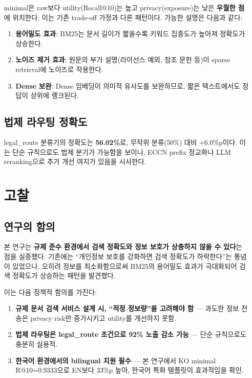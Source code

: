 \documentclass[11pt,a4paper]{article}
\begin{document}
minimal은 raw보다 utility(Recall@10)는 높고 privacy(exposure)는 낮은 \textbf{우월한 점}에 위치한다. 이는 기존 trade-off 가정과 다른 패턴이다. 가능한 설명은 다음과 같다:

\begin{enumerate}
\item \textbf{용어밀도 효과}: BM25는 문서 길이가 짧을수록 키워드 집중도가 높아져 정확도가 상승한다.
\item \textbf{노이즈 제거 효과}: 원문의 부가 설명(라이선스 예외, 참조 문헌 등)이 sparse retrieval에 노이즈로 작용한다.
\item \textbf{Dense 보완}: Dense 임베딩이 의미적 유사도를 보완하므로, 짧은 텍스트에서도 정답이 상위에 랭크된다.
\end{enumerate}

\subsection{법제 라우팅 정확도}
legal\_route 분류기의 정확도는 \textbf{56.02\%}로, 무작위 분류(50\%) 대비 +6.0\%p이다. 이는 단순 규칙으로도 법제 분기가 가능함을 보이나, ECCN prefix 정교화나 LLM reranking으로 추가 개선 여지가 있음을 시사한다.

\section{고찰}
\label{sec:discussion}

\subsection{연구의 함의}
본 연구는 \textbf{규제 준수 환경에서 검색 정확도와 정보 보호가 상충하지 않을 수 있다}는 점을 실증했다. 기존에는 ``개인정보 보호를 강화하면 검색 정확도가 하락한다''는 통념이 있었으나, 오히려 정보를 최소화함으로써 BM25의 용어밀도 효과가 극대화되어 검색 정확도가 상승하는 패턴을 발견했다.

이는 다음 정책적 함의를 가진다:

\begin{enumerate}
\item \textbf{규제 문서 검색 서비스 설계 시, ``적정 정보량''을 고려해야 함} — 과도한 정보 전송은 privacy risk만 증가시키고 utility를 개선하지 못함.
\item \textbf{법제 라우팅은 legal\_route 조건으로 92\% 노출 감소 가능} — 단순 규칙으로도 충분히 실용적.
\item \textbf{한국어 환경에서의 bilingual 지원 필수} — 본 연구에서 KO minimal R@10=0.9333으로 EN보다 33\%p 높아, 한국어 특화 템플릿이 효과적임을 확인.
\end{enumerate}
\end{document}

